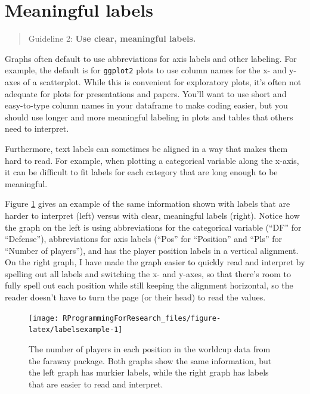 \documentclass[]{book}
\theoremstyle{definition}
\theoremstyle{definition}
\theoremstyle{definition}
\theoremstyle{remark}
\begin{document}
\section{Meaningful labels}\label{meaningful-labels}

\begin{quote}
Guideline 2: \textbf{Use clear, meaningful labels.}
\end{quote}

Graphs often default to use abbreviations for axis labels and other
labeling. For example, the default is for \texttt{ggplot2} plots to use
column names for the x- and y-axes of a scatterplot. While this is
convenient for exploratory plots, it's often not adequate for plots for
presentations and papers. You'll want to use short and easy-to-type
column names in your dataframe to make coding easier, but you should use
longer and more meaningful labeling in plots and tables that others need
to interpret.

Furthermore, text labels can sometimes be aligned in a way that makes
them hard to read. For example, when plotting a categorical variable
along the x-axis, it can be difficult to fit labels for each category
that are long enough to be meaningful.

Figure \ref{fig:labelsexample} gives an example of the same information
shown with labels that are harder to interpret (left) versus with clear,
meaningful labels (right). Notice how the graph on the left is using
abbreviations for the categorical variable (``DF'' for ``Defense''),
abbreviations for axis labels (``Pos'' for ``Position'' and ``Pls'' for
``Number of players''), and has the player position labels in a vertical
alignment. On the right graph, I have made the graph easier to quickly
read and interpret by spelling out all labels and switching the x- and
y-axes, so that there's room to fully spell out each position while
still keeping the alignment horizontal, so the reader doesn't have to
turn the page (or their head) to read the values.

\begin{figure}

{\centering \texttt{[image: RProgrammingForResearch\_files/figure-latex/labelsexample-1]} 

}

\caption{The number of players in each position in the worldcup data from the faraway package. Both graphs show the same information, but the left graph has murkier labels, while the right graph has labels that are easier to read and interpret.}\label{fig:labelsexample}
\end{figure}
\end{document}
